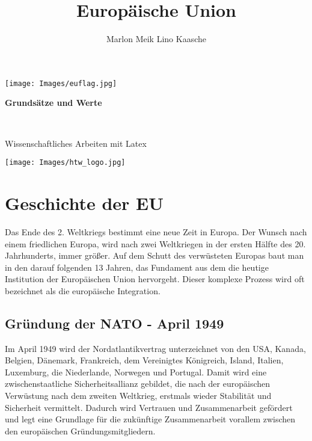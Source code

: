 \documentclass[12pt, oneside]{book} %
\title{Europäische Union}
\author{Marlon Meik Lino Kaasche}
\begin{document}
\begin{titlepage}
    \center
    \vspace*{1cm}
    \texttt{[image: Images/euflag.jpg]}
    \vspace*{0.5cm}\par
    {\fontsize{50}{60} \textbf{\thetitle}\par}
    \vspace*{0.2cm}
    {\fontsize{30}{30}\selectfont \textbf{Grundsätze  und Werte} \par}
    \vspace*{1cm}
    {\fontsize{24}{30}\selectfont{\theauthor} \\}
    {\fontsize{18}{30} \par}
    {\fontsize{18}{22}\selectfont Wissenschaftliches Arbeiten mit Latex \par}
    \vspace*{1cm}
    \texttt{[image: Images/htw\_logo.jpg]}
    \vspace*{1cm}
\end{titlepage}

\tableofcontents

\chapter{Geschichte der EU}

Das Ende des 2. Weltkriegs bestimmt eine neue Zeit in Europa. Der Wunsch nach einem friedlichen Europa, wird nach zwei Weltkriegen in der ersten Hälfte des 20. Jahrhunderts, immer größer. Auf dem Schutt des verwüsteten Europas baut man in den darauf folgenden 13 Jahren, das Fundament aus dem die heutige Institution der Europäischen Union hervorgeht. Dieser komplexe Prozess wird oft bezeichnet als die europäische Integration\parencite[]{montanunion}.


\section{Gründung der NATO - April 1949}
Im April 1949 wird der Nordatlantikvertrag unterzeichnet von den USA, Kanada, Belgien, Dänemark, Frankreich, dem Vereinigtes Königreich, Island, Italien, Luxemburg, die Niederlande, Norwegen und Portugal. Damit wird eine zwischenstaatliche Sicherheitsallianz gebildet, die nach der europäischen Verwüstung nach dem zweiten Weltkrieg, erstmals wieder Stabilität und Sicherheit vermittelt. Dadurch wird Vertrauen und Zusammenarbeit gefördert und legt eine Grundlage für die zukünftige Zusammenarbeit vorallem zwischen den europäischen Gründungsmitgliedern.
\end{document}

